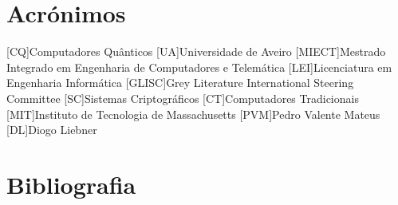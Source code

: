 \documentclass{report}
\begin{document}
\clearpage
\null

\chapter{Acrónimos}
\label{acrónimos}
\begin{acronym}
[CQ]{Computadores Quânticos}
[UA]{Universidade de Aveiro}
[MIECT]{Mestrado Integrado em Engenharia de Computadores e Telemática}
[LEI]{Licenciatura em Engenharia Informática}
[GLISC]{Grey Literature International Steering Committee}
[SC]{Sistemas Criptográficos}
[CT]{Computadores Tradicionais}
[MIT]{Instituto de Tecnologia de Massachusetts}
[PVM]{Pedro Valente Mateus}
[DL]{Diogo Liebner}
\end{acronym}



\clearpage
\null
\chapter{Bibliografia}
\label{chap.Bibliografia}
\printbibliography
\end{document}

